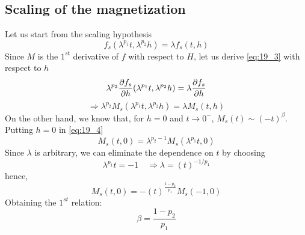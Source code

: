 \documentclass[../main/main.tex]{subfiles}
\begin{document}
\subsection{Scaling of the magnetization}
Let us start from the scaling hypothesis
\begin{equation}
  f_s (\lambda ^{p_1}t, \lambda ^{p_2}h) = \lambda f_s (t,h)
  \label{eq:19_3}
\end{equation}
Since \( M \) is the \( 1^{st} \) derivative of \( f \) with respect to \( H \), let us derive   \eqref{eq:19_3} with respect to \( h \)
\begin{equation}
  \lambda ^{p_2} \pdv{f_s}{h} \qty(\lambda ^{p_1}t, \lambda ^{p_2}h) = \lambda \pdv{f_s}{h} (t,h)
\end{equation}
\begin{equation}
  \Rightarrow \lambda ^{p_2} M_s ( \lambda ^{p_1} t, \lambda ^{p_2} h) = \lambda M_s (t,h)
  \label{eq:19_4}
\end{equation}
On the other hand, we know that, for \( h=0 \) and \( t \rightarrow 0^- \), \( M_s (t) \sim (-t)^{\beta } \). Putting \( h=0 \) in \eqref{eq:19_4}
\begin{equation}
  M_s (t,0) = \lambda ^{p_2 -1} M_s ( \lambda ^{p_1} t,0)
\end{equation}
Since \( \lambda  \) is arbitrary, we can eliminate the dependence on \( t \) by choosing
\begin{equation}
  \lambda ^{p_1} t = -1 \quad \Rightarrow \lambda = (t)^{-1/p_1}
\end{equation}
hence,
\begin{equation}
  M_s (t,0) = - (t)^{\frac{1-p_2}{p_1}} M_s (-1,0)
\end{equation}
Obtaining the \( 1^{st} \) relation:
\begin{equation}
  \beta = \frac{1-p_2}{p_1}
\end{equation}
\end{document}
